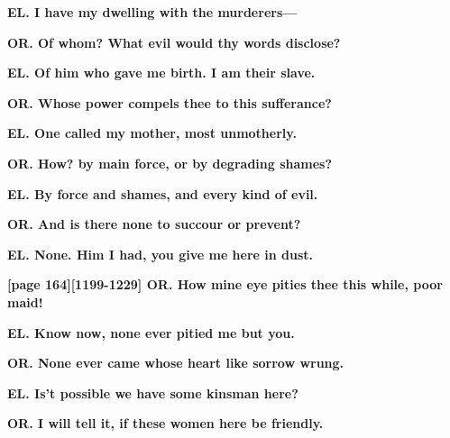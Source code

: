 \documentclass[11pt,letter]{book}
\begin{document}
\par \textbf{EL. I have my dwelling with the murderers—}
\par 

\par \textbf{OR. Of whom? What evil would thy words disclose?}
\par 

\par \textbf{EL. Of him who gave me birth. I am their slave.}
\par 

\par \textbf{OR. Whose power compels thee to this sufferance?}
\par 

\par \textbf{EL. One called my mother, most unmotherly.}
\par 

\par \textbf{OR. How? by main force, or by degrading shames?}
\par 

\par \textbf{EL. By force and shames, and every kind of evil.}
\par 

\par \textbf{OR. And is there none to succour or prevent?}
\par 

\par \textbf{EL. None. Him I had, you give me here in dust.}
\par 

\par \textbf{[page 164][1199-1229] OR. How mine eye pities thee this while, poor maid!}
\par 

\par \textbf{EL. Know now, none ever pitied me but you.}
\par 

\par \textbf{OR. None ever came whose heart like sorrow wrung.}
\par 

\par \textbf{EL. Is’t possible we have some kinsman here?}
\par 

\par \textbf{OR. I will tell it, if these women here be friendly.}
\par 
\end{document}
